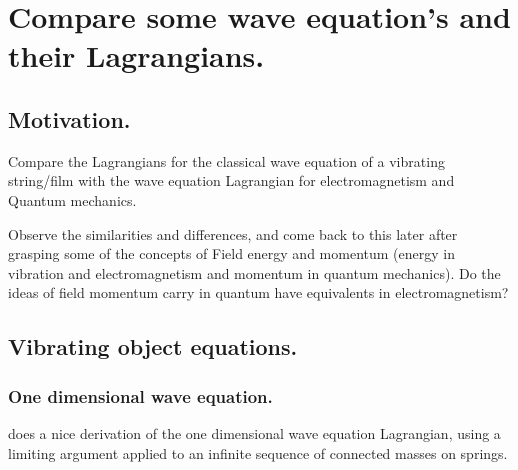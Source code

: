 
%
%


%

\chapter{Compare some wave equation's and their Lagrangians. }

%



\section{Motivation. }

Compare the Lagrangians for the classical wave equation of a vibrating string/film with the wave equation Lagrangian for electromagnetism and Quantum mechanics.

Observe the similarities and differences, and come back to this later after grasping some of the concepts of Field energy and momentum (energy in vibration and electromagnetism and momentum in quantum mechanics).  Do the ideas of field momentum carry in quantum have equivalents in electromagnetism?

\section{Vibrating object equations. }

\subsection{One dimensional wave equation. }

\cite{goldstein1951cm} does a nice derivation of the one dimensional wave
equation Lagrangian, using a limiting argument applied to an infinite
sequence of connected masses on springs.

